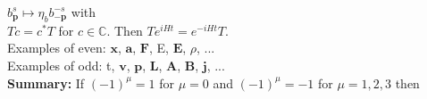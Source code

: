 \documentclass[a4paper, norsk, 8pt, landscape]{article}
\begin{document}
\begin{multicols*}{3}
$b_\mathbf{p}^s \mapsto \eta_b b_{-\mathbf{p}}^{-s}$ with \\$Tc=c^*T$ for $c\in\mathbb{C}$.
Then $Te^{iHt}=e^{-iHt}T$. \\
Examples of even:
$\mathbf{x}$, $\mathbf{a}$, $\mathbf{F}$, E, $\mathbf{E}$, $\rho$, ... \\
Examples of odd:
t, $\mathbf{v}$, $\mathbf{p}$, $\mathbf{L}$, $\mathbf{A}$, $\mathbf{B}$, $\mathbf{j}$, ...
\\
 {\textbf{Summary:}}
If $(-1)^\mu=1$ for $\mu=0$ and $(-1)^\mu=-1$ for $\mu=1,2,3$ then \\


















\end{multicols*}
\end{document}
